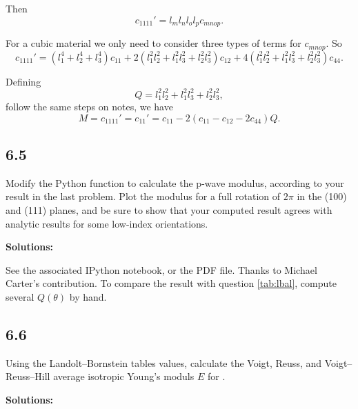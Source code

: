 \documentclass[12pt]{article}
\begin{document}
Then
\begin{equation}
  c_{1111}' = l_{m} l_{n} l_{o} l_{p} c_{mnop}.
\end{equation}

For a cubic material we only need to consider three types of terms for $c_{mnop}$.
So
\begin{equation}
  c_{1111}' = (l_1^4 + l_2^4 + l_3^4) c_{11} + 2(l_1^2 l_2^2 + l_1^2 l_3^2 + l_2^2 l_3^2) c_{12} + 4(l_1^2 l_2^2 + l_1^2 l_3^2 + l_2^2 l_3^2) c_{44}.
\end{equation}

Defining
\begin{equation}
  Q = l_1^2 l_2^2 + l_1^2 l_3^2 + l_2^2 l_3^2,
\end{equation}
follow the same steps on notes, we have
\begin{equation}
  M = c_{1111}' = c_{11}' = c_{11} - 2(c_{11} - c_{12} - 2 c_{44}) Q.
\end{equation}




\subsection{6.5}
Modify the Python function to calculate the p-wave modulus,
according to your result in the last problem.  Plot the modulus for a
full rotation of $2\pi$ in the \hkl(100) and \hkl(111) planes, and be sure to show that
your computed result agrees with analytic results for some low-index orientations.

\textbf{Solutions:}

See the associated IPython notebook, or the PDF file. Thanks to Michael Carter's contribution.
To compare the result with question \ref{tab:lbal}, compute several $Q(\theta)$ by hand.

\subsection{6.6}
Using the Landolt--Bornstein tables values, calculate the Voigt, Reuss,
and Voigt--Reuss--Hill average isotropic Young's moduls $E$ for .

\textbf{Solutions:}
\end{document}
